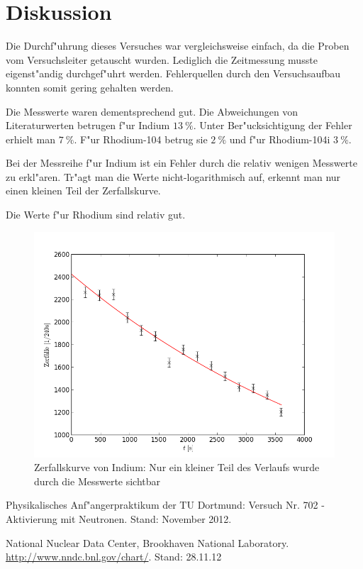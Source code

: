 \newpage
\section{Diskussion}
	\label{sec:diskussion}
	Die Durchf"uhrung dieses Versuches war vergleichsweise einfach, da die Proben vom Versuchsleiter getauscht wurden.
	Lediglich die Zeitmessung musste eigenst"andig durch\-ge\-f"uhrt werden.
	Fehlerquellen durch den Versuchsaufbau konnten somit gering gehalten werden.

	Die Messwerte waren dementsprechend gut.
	Die Abweichungen von Literaturwerten \cite{halbwertszeiten} betrugen f"ur Indium $\SI{13}{\percent}$.
	Unter Ber"ucksichtigung der Fehler erhielt man $\SI{7}{\percent}$. 
	F"ur Rhodium-104 betrug sie $\SI{2}{\percent}$ und f"ur Rhodium-104i $\SI{3}{\percent}$.

	Bei der Messreihe f"ur Indium ist ein Fehler durch die relativ wenigen Messwerte zu erkl"aren.
	Tr"agt man die Werte nicht-logarithmisch auf, erkennt man nur einen kleinen Teil der Zerfallskurve.

	Die Werte f"ur Rhodium sind relativ gut.

	\begin{figure}[!h]
		\centering
		\includegraphics[width = 13cm]{img/graph_indium.png}
		\caption{Zerfallskurve von Indium: Nur ein kleiner Teil des Verlaufs wurde durch die Messwerte sichtbar}
		\label{fig:indium_orig}
	\end{figure}

	\enlargethispage{2cm}

\begin{thebibliography}{9}
	 Physikalisches Anf"angerpraktikum der TU Dortmund: Versuch Nr. 702 - Aktivierung mit Neutronen. Stand: November 2012.

	  National Nuclear Data Center, Brookhaven National Laboratory. \url{http://www.nndc.bnl.gov/chart/}. Stand: 28.11.12
\end{thebibliography}
